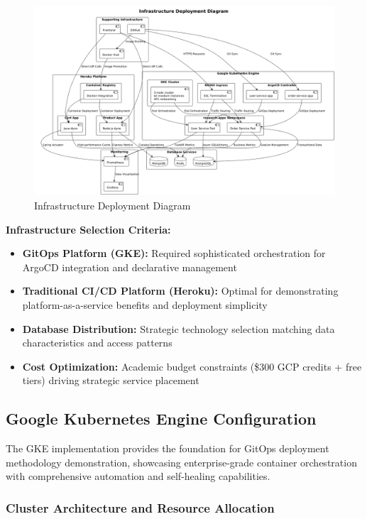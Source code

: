 \begin{figure}[H]
\centering
\includegraphics[width=1.0\textwidth]{figures/Infrastructure-Deployment-Diagram.png}
\caption{Infrastructure Deployment Diagram}
\label{fig:infrastructure-deployment-diagram}
\end{figure}

\textbf{Infrastructure Selection Criteria:}
\begin{itemize}
\item \textbf{GitOps Platform (GKE):} Required sophisticated orchestration for ArgoCD integration and declarative management
\item \textbf{Traditional CI/CD Platform (Heroku):} Optimal for demonstrating platform-as-a-service benefits and deployment simplicity
\item \textbf{Database Distribution:} Strategic technology selection matching data characteristics and access patterns
\item \textbf{Cost Optimization:} Academic budget constraints (\$300 GCP credits + free tiers) driving strategic service placement
\end{itemize}

\subsection{Google Kubernetes Engine Configuration}

The GKE implementation provides the foundation for GitOps deployment methodology demonstration, showcasing enterprise-grade container orchestration with comprehensive automation and self-healing capabilities.

\subsubsection{Cluster Architecture and Resource Allocation}

